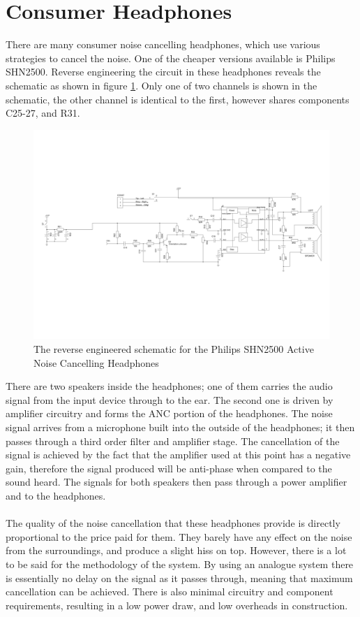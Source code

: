 \section{Consumer Headphones}
\label{sec:philipsphones}
There are many consumer noise cancelling headphones, which use various strategies to cancel the noise.
One of the cheaper versions available is Philips SHN2500.
Reverse engineering the circuit in these headphones reveals the schematic as shown in figure \ref{fig:philipsphonessche}.
Only one of two channels is shown in the schematic, the other channel is identical to the first, however shares components C25-27, and R31.
\\
\begin{figure}
	\centering
	\includegraphics[width=\textwidth]{./img/hp.pdf}
	\caption{The reverse engineered schematic for the Philips SHN2500 Active Noise Cancelling Headphones}
	\label{fig:philipsphonessche}
\end{figure}

\noindent
There are two speakers inside the headphones; one of them carries the audio signal from the input device through to the ear.
The second one is driven by amplifier circuitry and forms the ANC portion of the headphones.
The noise signal arrives from a microphone built into the outside of the headphones; it then passes through a third order filter and amplifier stage.
The cancellation of the signal is achieved by the fact that the amplifier used at this point has a negative gain, therefore the signal produced will be anti-phase when compared to the sound heard.
The signals for both speakers then pass through a power amplifier and to the headphones.
\\
\\
The quality of the noise cancellation that these headphones provide is directly proportional to the price paid for them. They barely have any effect on the noise from the surroundings, and produce a slight hiss on top.
However, there is a lot to be said for the methodology of the system. By using an analogue system there is essentially no delay on the signal as it passes through, meaning that maximum cancellation can be achieved.
There is also minimal circuitry and component requirements, resulting in a low power draw, and low overheads in construction.
